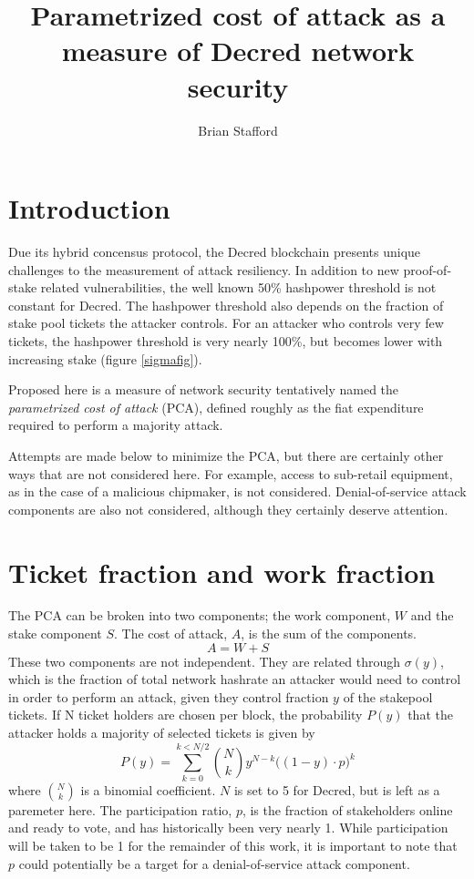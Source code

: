 \documentclass[a4paper,12pt]{article}
\begin{document}
\title{Parametrized cost of attack as a measure of Decred network security}
\author{Brian Stafford}
\maketitle

\section{Introduction}

Due its hybrid concensus protocol, the Decred blockchain presents unique challenges to the measurement of attack resiliency. In addition to new proof-of-stake related vulnerabilities, the well known 50\% hashpower threshold is not constant for Decred. The hashpower threshold also depends on the fraction of stake pool tickets the attacker controls. For an attacker who controls very few tickets, the hashpower threshold is very nearly 100\%, but becomes lower with increasing stake (figure \ref{sigmafig}). 


Proposed here is a measure of network security tentatively named the \emph{parametrized cost of attack} (PCA), defined roughly as the fiat expenditure required to perform a majority attack. 

Attempts are made below to minimize the PCA, but there are certainly other ways that are not considered here. For example, access to sub-retail equipment, as in the case of a malicious chipmaker, is not considered. Denial-of-service attack components are also not considered, although they certainly deserve attention. 

\section{Ticket fraction and work fraction}
The PCA can be broken into two components; the work component, $W$ and the stake component $S$. The cost of attack, $A$, is the sum of the components.
%
\begin{equation}
A = W + S
\end{equation}
%
These two components are not independent. They are related through $ \sigma(y) $, which is the fraction of total network hashrate an attacker would need to control in order to perform an attack, given they control fraction $ y $ of the stakepool tickets. If N ticket holders are chosen per block, the probability $ P(y) $ that the attacker holds a majority of selected tickets is given by 
%
\begin{equation}
P(y) = \sum_{k=0}^{k < N/2}  {{N}\choose{k}}   y^{N-k} \Big( (1-y) \cdot p \Big)^k
\end{equation}
%
where $ {{N}\choose{k}}  $ is a binomial coefficient. $ N $ is set to 5 for Decred, but is left as a paremeter here. The participation ratio, $ p $, is the fraction of stakeholders online and ready to vote, and has historically been very nearly 1. While participation will be taken to be 1 for the remainder of this work, it is important to note that $ p $ could potentially be a target for a denial-of-service attack component. 
\end{document}
